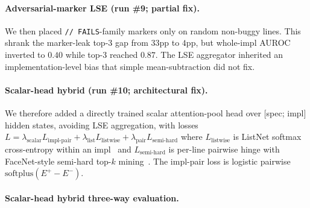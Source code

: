 \documentclass[10pt]{article}
\begin{document}
\paragraph{Adversarial-marker LSE (run \#9; partial fix).} We then
placed \texttt{// FAILS}-family markers only on random non-buggy lines.
This shrank the marker-leak top-3 gap from $33$pp to $4$pp, but
whole-impl AUROC inverted to $0.40$ while top-3 reached $0.87$. The
LSE aggregator inherited an implementation-level bias that simple
mean-subtraction did not fix.

\paragraph{Scalar-head hybrid (run \#10; architectural fix).} We
therefore added a directly trained scalar attention-pool head over
$[$spec; impl$]$ hidden states, avoiding LSE aggregation, with losses
$L = \lambda_{\text{scalar}} L_{\text{impl-pair}} +
\lambda_{\text{list}} L_{\text{listwise}} +
\lambda_{\text{pair}} L_{\text{semi-hard}}$
where $L_{\text{listwise}}$ is ListNet softmax cross-entropy within
an impl~\cite{cao2007listnet} and $L_{\text{semi-hard}}$ is per-line
pairwise hinge with FaceNet-style semi-hard top-$k$
mining~\cite{schroff2015facenet,wu2017samplingmatters}. The impl-pair
loss is logistic pairwise $\text{softplus}(E^+ - E^-)$.

\paragraph{Scalar-head hybrid three-way evaluation.}
\end{document}
